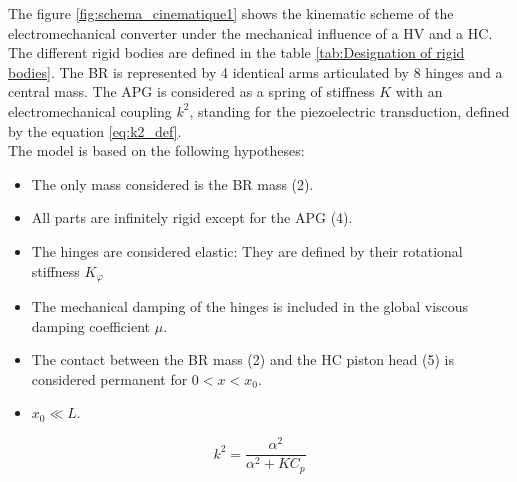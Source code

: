 \documentclass[3p,twocolumn,preprint]{elsarticle}
\begin{document}
The figure \ref{fig:schema_cinematique1} shows the kinematic scheme of the electromechanical converter under the mechanical influence of a HV and a HC. The different rigid bodies are defined in the table \ref{tab:Designation of rigid bodies}. The BR is represented by 4 identical arms articulated by 8 hinges and a central mass. The APG is considered as a spring of stiffness $K$ with an electromechanical coupling $k^2$, standing for the piezoelectric transduction, defined by the equation \ref{eq:k2_def}.\\
The model is based on the following hypotheses:
\begin{itemize}
	\item The only mass considered is the BR mass (2).
	\item All parts are infinitely rigid except for the APG (4).
	\item The hinges are considered elastic: They are defined by their rotational stiffness $K_{\varphi}$
	\item The mechanical damping of the hinges is included in the global viscous damping coefficient $\mu$.
	\item The contact between the BR mass (2) and the HC piston head (5) is considered permanent for $0 < x < x_0$.
	\item \mbox{$x_0 \ll L$}. 
\end{itemize}
\begin{equation}
	k^2 = \dfrac{\alpha^2}{\alpha^2 +  K C_p}
	\label{eq:k2_def}
\end{equation}
\begin{table}[!htbp]
\centering
{}
\caption{Definition of figure \ref{fig:schema_cinematique1} bodies}
\label{tab:Designation of rigid bodies}
\end{table}
\end{document}
